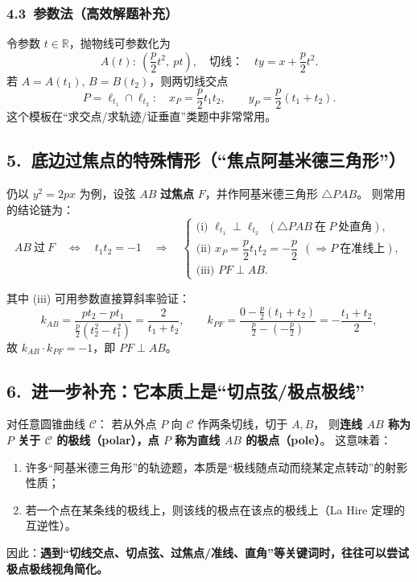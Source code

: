 \documentclass[UTF8]{ctexart}
\begin{document}
	\subsubsection*{4.3\ 参数法（高效解题补充）}
	令参数 $t\in\mathbb R$，抛物线可参数化为
	\[
	A(t):\ \left(\frac p2 t^2,\ pt\right),
	\quad\text{切线：}\quad
	ty=x+\frac p2 t^2.
	\]
	若 $A=A(t_1),\,B=B(t_2)$，则两切线交点
	\[
	P=\ell_{t_1}\cap \ell_{t_2}:
	\quad
	x_P=\frac p2 t_1t_2,\qquad
	y_P=\frac p2 (t_1+t_2).
	\]
	这个模板在“求交点/求轨迹/证垂直”类题中非常常用。
	
	\subsection*{5.\ 底边过焦点的特殊情形（“焦点阿基米德三角形”）}
	仍以 $y^2=2px$ 为例，设弦 $AB$ \textbf{过焦点} $F$，并作阿基米德三角形 $\triangle PAB$。
	则常用的结论链为：
	\[
	AB\ \text{过}\ F
	\quad\Longleftrightarrow\quad
	t_1t_2=-1
	\quad\Longrightarrow\quad
	\begin{cases}
		\text{(i) } \ell_{t_1}\perp \ell_{t_2}\ \ (\triangle PAB\ \text{在}\ P\ \text{处直角}),\\[2pt]
		\text{(ii) } x_P=\dfrac p2 t_1t_2=-\dfrac p2\ \ (\Rightarrow P\ \text{在准线上}),\\[2pt]
		\text{(iii) } PF\perp AB.
	\end{cases}
	\]
	
	其中 (iii) 可用参数直接算斜率验证：
	\[
	k_{AB}=\frac{pt_2-pt_1}{\frac p2(t_2^2-t_1^2)}=\frac{2}{t_1+t_2},\qquad
	k_{PF}=\frac{0-\frac p2(t_1+t_2)}{\frac p2-(-\frac p2)}=-\frac{t_1+t_2}{2},
	\]
	故 $k_{AB}\cdot k_{PF}=-1$，即 $PF\perp AB$。
	
	\subsection*{6.\ 进一步补充：它本质上是“切点弦/极点极线”}
	对任意圆锥曲线 $\mathcal C$：
	若从外点 $P$ 向 $\mathcal C$ 作两条切线，切于 $A,B$，
	则\textbf{连线 $AB$ 称为 $P$ 关于 $\mathcal C$ 的极线（polar），点 $P$ 称为直线 $AB$ 的极点（pole）}。
	这意味着：
	\begin{enumerate}
		\item 许多“阿基米德三角形”的轨迹题，本质是“极线随点动而绕某定点转动”的射影性质；
		\item 若一个点在某条线的极线上，则该线的极点在该点的极线上（La Hire 定理的互逆性）。
	\end{enumerate}
	因此：\textbf{遇到“切线交点、切点弦、过焦点/准线、直角”等关键词时，往往可以尝试极点极线视角简化。}
	
\end{document}
